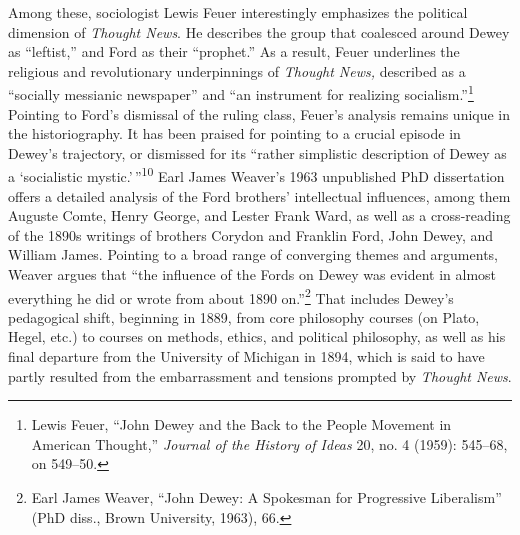 \documentclass[openany,nobib]{tufte-book}
\begin{document}
Among these, sociologist Lewis Feuer interestingly emphasizes the
political dimension of \emph{Thought News}. He describes the group that
coalesced around Dewey as ``leftist,'' and Ford as their ``prophet.'' As
a result, Feuer underlines the religious and revolutionary underpinnings
of \emph{Thought News,} described as a ``socially messianic newspaper''
and ``an instrument for realizing socialism.''\footnote{Lewis Feuer,
  ``John Dewey and the Back to the People Movement in American
  Thought,'' \emph{Journal of the History of Ideas} 20, no. 4 (1959):
  545--68, on 549--50.} Pointing to Ford's dismissal of the ruling
class, Feuer's analysis remains unique in the historiography. It has
been praised for pointing to a crucial episode in Dewey's trajectory, or
dismissed for its ``rather simplistic description of Dewey as a
`socialistic mystic.'\,''\textsuperscript{10} Earl James Weaver's 1963
unpublished PhD dissertation offers a detailed analysis of the Ford
brothers' intellectual influences, among them Auguste Comte, Henry
George, and Lester Frank Ward, as well as a cross-reading of the 1890s
writings of brothers Corydon and Franklin Ford, John Dewey, and William
James. Pointing to a broad range of converging themes and arguments,
Weaver argues that ``the influence of the Fords on Dewey was evident in
almost everything he did or wrote from about 1890 on.''\footnote{Earl
  James Weaver, ``John Dewey: A Spokesman for Progressive Liberalism''
  (PhD diss., Brown University, 1963), 66.} That includes Dewey's
pedagogical shift, beginning in 1889, from core philosophy courses (on
Plato, Hegel, etc.) to courses on methods, ethics, and political
philosophy, as well as his final departure from the University of
Michigan in 1894, which is said to have partly resulted from the
embarrassment and tensions prompted by \emph{Thought News}.
\end{document}
